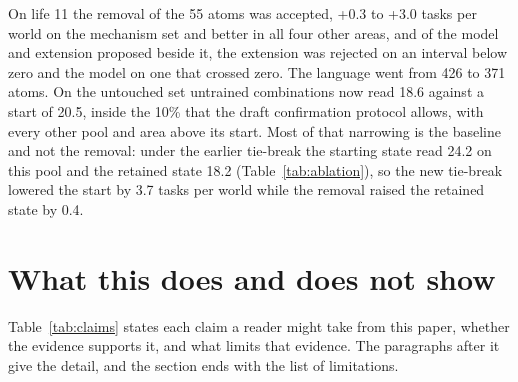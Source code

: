 \documentclass[11pt]{article}
\begin{document}
On life 11 the removal of the 55 atoms was accepted, +0.3 to +3.0 tasks per world on the mechanism set and better in all four other areas, and of the model and extension proposed beside it, the extension was rejected on an interval below zero and the model on one that crossed zero. The language went from 426 to 371 atoms. On the untouched set untrained combinations now read 18.6 against a start of 20.5, inside the 10\% that the draft confirmation protocol allows, with every other pool and area above its start. Most of that narrowing is the baseline and not the removal: under the earlier tie-break the starting state read 24.2 on this pool and the retained state 18.2 (Table~\ref{tab:ablation}), so the new tie-break lowered the start by 3.7 tasks per world while the removal raised the retained state by 0.4.

\section{What this does and does not show}

Table~\ref{tab:claims} states each claim a reader might take from this paper, whether the evidence supports it, and what limits that evidence. The paragraphs after it give the detail, and the section ends with the list of limitations.
\end{document}
